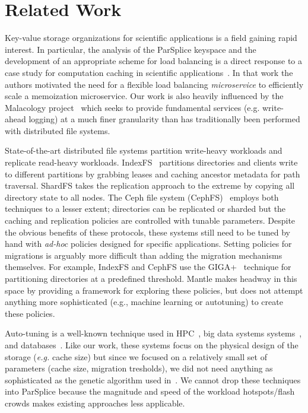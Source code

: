 \section{Related Work}

Key-value storage organizations for scientific applications is a field gaining
rapid interest. In particular, the analysis of the ParSplice keyspace and the
development of an appropriate scheme for load balancing is a direct response to
a case study for computation caching in scientific
applications~\cite{jenkins:ipdsw17-mochi}. In that work the authors motivated
the need for a flexible load balancing \emph{microservice} to efficiently scale
a memoization microservice. Our work is also heavily influenced by the
Malacology project~\cite{sevilla:eurosys17-malacology} which seeks to provide
fundamental services (e.g. write-ahead logging) at a much finer granularity
than has traditionally been performed with distributed file systems.  

State-of-the-art distributed file systems partition write-heavy workloads and
replicate read-heavy workloads.  IndexFS~\cite{ren:sc2014-indexfs} partitions
directories and clients write to different partitions by grabbing leases and
caching ancestor metadata for path traversal. ShardFS takes the replication
approach to the extreme by copying all directory state to all nodes. The Ceph
file system (CephFS)~\cite{weil:sc2004-dyn-metadata, weil:osdi2006-ceph}
employs both techniques to a lesser extent; directories can be replicated or
sharded but the caching and replication policies are controlled with tunable
parameters.  Despite the obvious benefits of these protocols, these systems
still need to be tuned by hand with {\it ad-hoc} policies designed for specific
applications.  Setting policies for migrations is arguably more difficult than
adding the migration mechanisms themselves.  For example, IndexFS and CephFS
use the GIGA+~\cite{patil:fast2011-giga} technique for partitioning directories
at a predefined threshold. Mantle makes headway in this space by providing a
framework for exploring these policies, but does not attempt anything more
sophisticated (e.g., machine learning or autotuning) to create these policies. 

Auto-tuning is a well-known technique used in
HPC~\cite{behzad:sc2013-autotuning, behzad:techreport2014-io-autotuning}, big
data systems systems~\cite{herodotou_starfish_2011}, and
databases~\cite{schnaitter_index_2009}.  Like our work, these systems focus on
the physical design of the storage ({\it e.g.} cache size) but since we focused
on a relatively small set of parameters (cache size, migration tresholds), we
did not need anything as sophisticated as the genetic algorithm used
in~\cite{behzad:sc2013-autotuning}.  We cannot drop these techniques into
ParSplice because the magnitude and speed of the workload hotspots/flash crowds
makes existing approaches less applicable. 

